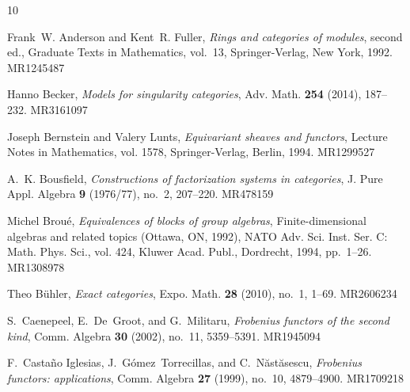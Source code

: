 \documentclass[12pt,twoside]{amsart}
\theoremstyle{bfupright head,slanted body}
\theoremstyle{bfupright head,upright body}
\theoremstyle{fixed bf head,slanted body}
\theoremstyle{fixed bf head,upright body}
\theoremstyle{numbered paragraph}
\numberwithin{equation}{res}
\begin{document}
\def\cprime{$'$}
  \providecommand{\arxiv}[2][AC]{\mbox{\href{http://arxiv.org/abs/#2}{\sf
  arXiv:#2 [math.#1]}}}
  \providecommand{\oldarxiv}[2][AC]{\mbox{\href{http://arxiv.org/abs/math/#2}{\sf
  arXiv:math/#2
  [math.#1]}}}\providecommand{\MR}[1]{\mbox{\href{http://www.ams.org/mathscinet-getitem?mr=#1}{#1}}}
  \renewcommand{\MR}[1]{\mbox{\href{http://www.ams.org/mathscinet-getitem?mr=#1}{#1}}}
\providecommand{\bysame}{\leavevmode\hbox to3em{\hrulefill}\thinspace}
\providecommand{\MR}{\relax\ifhmode\unskip\space\fi MR }
\providecommand{\MRhref}[2]{%
  \href{http://www.ams.org/mathscinet-getitem?mr=#1}{#2}
}
\providecommand{\href}[2]{#2}
\begin{thebibliography}{10}

Frank~W. Anderson and Kent~R. Fuller, \emph{Rings and categories of modules},
  second ed., Graduate Texts in Mathematics, vol.~13, Springer-Verlag, New
  York, 1992. \MR{MR1245487}

Hanno Becker, \emph{Models for singularity categories}, Adv. Math. \textbf{254}
  (2014), 187--232. \MR{MR3161097}

Joseph Bernstein and Valery Lunts, \emph{Equivariant sheaves and functors},
  Lecture Notes in Mathematics, vol. 1578, Springer-Verlag, Berlin, 1994.
  \MR{MR1299527}

A.~K. Bousfield, \emph{Constructions of factorization systems in categories},
  J. Pure Appl. Algebra \textbf{9} (1976/77), no.~2, 207--220. \MR{MR478159}

Michel Brou\'{e}, \emph{Equivalences of blocks of group algebras},
  Finite-dimensional algebras and related topics ({O}ttawa, {ON}, 1992), NATO
  Adv. Sci. Inst. Ser. C: Math. Phys. Sci., vol. 424, Kluwer Acad. Publ.,
  Dordrecht, 1994, pp.~1--26. \MR{MR1308978}

Theo B\"{u}hler, \emph{Exact categories}, Expo. Math. \textbf{28} (2010),
  no.~1, 1--69. \MR{MR2606234}

S.~Caenepeel, E.~De~Groot, and G.~Militaru, \emph{Frobenius functors of the
  second kind}, Comm. Algebra \textbf{30} (2002), no.~11, 5359--5391.
  \MR{MR1945094}

F.~Casta\~{n}o Iglesias, J.~G\'{o}mez~Torrecillas, and C.~N\u{a}st\u{a}sescu,
  \emph{Frobenius functors: applications}, Comm. Algebra \textbf{27} (1999),
  no.~10, 4879--4900. \MR{MR1709218}


\end{thebibliography}
\end{document}
